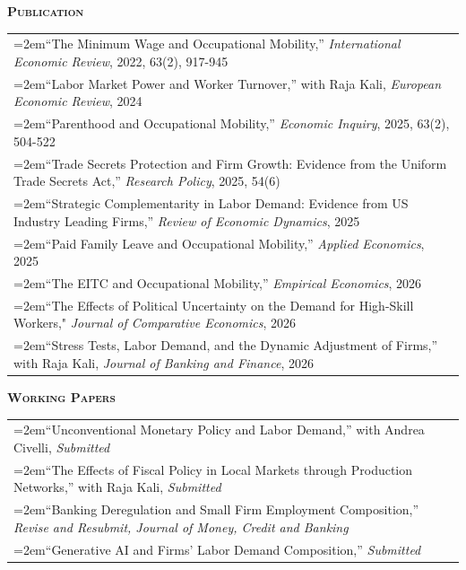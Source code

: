\documentclass[11pt]{article}
\newenvironment{rSection}[1]{ %
  {\large\bf\textsc{#1}}
  \vspace{0.15cm}
  \begin{list}{}{ %
    \setlength{\leftmargin}{1.5em} %
    \setlength{\rightmargin}{1.5em}
  }
  \item[]
}{
  \end{list}
  \vspace{0.15cm}
}
\begin{document}
\begin{rSection}{Publication}
\begin{tabularx}{\linewidth}{>{\hangindent=2em}X}
``The Minimum Wage and Occupational Mobility,'' \emph{International Economic Review}, 2022, 63(2), 917-945\\
``Labor Market Power and Worker Turnover,'' with Raja Kali, \emph{European Economic Review}, 2024\\
``Parenthood and Occupational Mobility,'' \emph{Economic Inquiry}, 2025, 63(2), 504-522\\
``Trade Secrets Protection and Firm Growth: Evidence from the Uniform Trade Secrets Act,'' \emph{Research Policy}, 2025, 54(6)\\
``Strategic Complementarity in Labor Demand: Evidence from US Industry Leading Firms,'' \emph{Review of Economic Dynamics}, 2025\\
``Paid Family Leave and Occupational Mobility,'' \emph{Applied Economics}, 2025\\
``The EITC and Occupational Mobility,'' \emph{Empirical Economics}, 2026\\
``The Effects of Political Uncertainty on the Demand for High-Skill Workers," \emph{Journal of Comparative Economics}, 2026\\
``Stress Tests, Labor Demand, and the Dynamic Adjustment of Firms,'' with Raja Kali, \emph{Journal of Banking and Finance}, 2026\\
\end{tabularx}
\end{rSection}

\begin{rSection}{Working Papers}
\begin{tabularx}{\linewidth}{>{\hangindent=2em}X}
``Unconventional Monetary Policy and Labor Demand,'' with Andrea Civelli, \emph{Submitted}\\
``The Effects of Fiscal Policy in Local Markets through Production Networks,'' with Raja Kali, \emph{Submitted}\\
``Banking Deregulation and Small Firm Employment Composition,'' \emph{Revise and Resubmit, Journal of Money, Credit and Banking}\\
``Generative AI and Firms' Labor Demand Composition,'' \emph{Submitted}
\end{tabularx}
\end{rSection}

\end{document}
